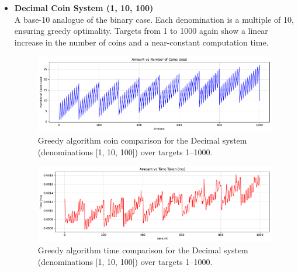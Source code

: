 \documentclass[12pt,a4paper]{report}
\begin{document}
\begin{itemize}
  \item \textbf{Decimal Coin System (1, 10, 100)}\\
  A base-10 analogue of the binary case. Each denomination is a multiple of 10, ensuring greedy optimality. Targets from 1 to 1000 again show a linear increase in the number of coins and a near-constant computation time.  
  \begin{figure}[H]
    \centering
    \includegraphics[width=\textwidth]{graphs/greedy_coins_decimal_plot.pdf}
    \caption{Greedy algorithm coin comparison for the Decimal system (denominations [1, 10, 100]) over targets 1--1000.}
    \label{fig:greedy_coins_decimal_plot}
  \end{figure}
  \begin{figure}[H]
    \centering
    \includegraphics[width=\textwidth]{graphs/greedy_time_decimal_plot.pdf}
    \caption{Greedy algorithm time comparison for the Decimal system (denominations [1, 10, 100]) over targets 1--1000.}
    \label{fig:greedy_time_decimal_plot}
  \end{figure}


\end{itemize}
\end{document}
